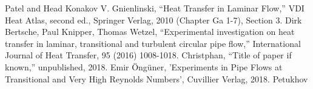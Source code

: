 \documentclass[conference]{IEEEtran}
\begin{document}
\begin{thebibliography}{00}
Patel and Head
Konakov
 V. Gnienlinski, ``Heat Transfer in Laminar Flow,'' VDI Heat Atlas, second ed., Springer Verlag, 2010 (Chapter Ga 1-7), Section 3.
 Dirk Bertsche, Paul Knipper, Thomas Wetzel, ``Experimental investigation on heat transfer in laminar, transitional and turbulent circular pipe flow,'' International Journal of Heat Transfer, 95 (2016) 1008-1018.
 Christphan, ``Title of paper if known,'' unpublished, 2018.
Emir Öngüner, 'Experiments in Pipe Flows at Transitional and Very High Reynolds Numbers', Cuvillier Verlag, 2018.
Petukhov




%
%

\end{thebibliography}
\end{document}
